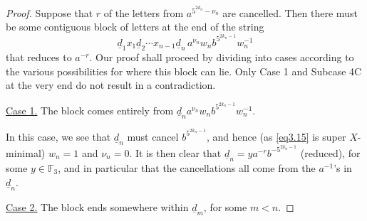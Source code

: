 \documentclass[twoside,11pt]{amsart}
\numberwithin{equation}{section}
\theoremstyle{definition}
\newcommand{\1}{\mathbbm{1}}
\newcommand{\F}{\mathbb F}
\newcommand{\pdt}{\underline}
\begin{document}
	
	\begin{proof}	
		Suppose that $r$ of the letters from $a^{5^{2k_n} - \nu_n}$ are cancelled. Then there must be some contiguous block of letters at the end of the string
		\begin{equation}		\label{eq3.14}
			\pdt{d}_1x_1 \pdt{d}_2 \cdots x_{n-1} \pdt{d}_n \, a^{\nu_n} w_n b^{5^{2k_n-1}} w_n^{-1}
		\end{equation}
		that reduces to $a^{-r}$. Our proof shall proceed by dividing into cases according to the various possibilities for where this block can lie. Only Case 1 and Subcase 4C at the very end do not result in a contradiction.
		
		\vskip 2mm
		\noindent
		\underline{Case 1.} The block comes entirely from $\pdt{d}_n a^{\nu_n} w_n b^{5^{2k_n-1}} w_n^{-1}$.
		
		In this case, we see that $\pdt{d}_n$ must cancel $b^{5^{2k_n-1}}$, and hence (as \eqref{eq3.15} is super $X$-minimal) $w_n=1$ and $\nu_n = 0$. It is then clear that $\pdt{d}_n = y a^{-r}b^{-5^{2k_n-1}}$ (reduced), for some $y \in \F_3$, and  in particular that the cancellations all come from the $a^{-1}$'s in $\pdt{d}_n$.
		
		\vskip 2mm
		\noindent
		\underline{Case 2.} The block ends somewhere within $\pdt{d}_m$, for some $m<n$. 
		
		
		

\end{proof}
\end{document}
